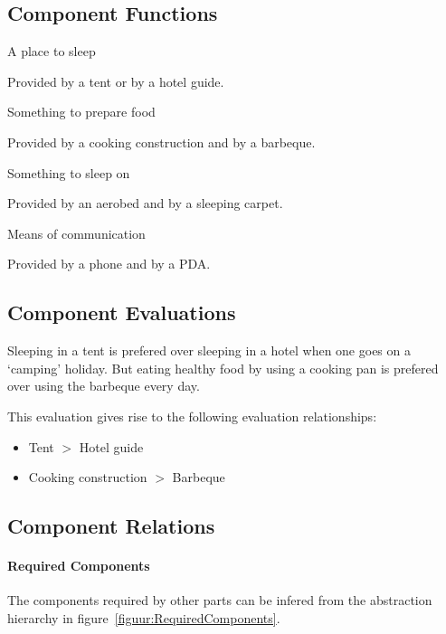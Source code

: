 \documentclass[a4paper,11pt]{article}
\begin{document}
\subsection*{Component Functions}

\begin{description}

\item{A place to sleep}

Provided by a tent or by a hotel guide.

\item{Something to prepare food}

Provided by a cooking construction and by a barbeque.

\item{Something to sleep on}

Provided by an aerobed and by a sleeping carpet.

\item{Means of communication}

Provided by a phone and by a PDA.

\end{description}


\subsection*{Component Evaluations}

Sleeping in a tent is prefered over sleeping in a hotel
when one goes on a `camping' holiday. But eating healthy
food by using a cooking pan is prefered over using the
barbeque every day.

This evaluation gives rise to the following evaluation
relationships:

\begin{itemize}
\item Tent $>$ Hotel guide
\item Cooking construction $>$ Barbeque
\end{itemize}


\subsection*{Component Relations}

\paragraph{Required Components}

The components required by other parts can be infered from the abstraction 
hierarchy in figure~\ref{figuur:RequiredComponents}.
\end{document}
